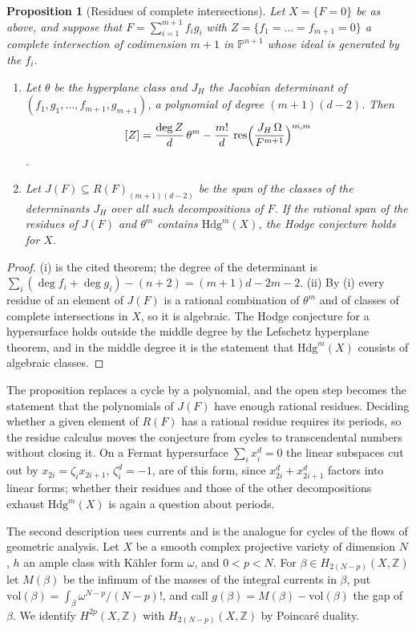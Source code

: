 \documentclass[11pt,reqno]{amsart}
\numberwithin{equation}{section}
\theoremstyle{plain}
\newtheorem{proposition}[theorem]{Proposition}
\theoremstyle{definition}
\newcommand{\ZZ}{\mathbb{Z}}
\newcommand{\PP}{\mathbb{P}}
\newcommand{\Hdg}{\mathrm{Hdg}}
\begin{document}
\begin{proposition}[Residues of complete intersections]\label{prop:residues}
Let $X=\{F=0\}$ be as above, and suppose that $F=\sum_{i=1}^{m+1}f_{i}g_{i}$ with $Z=\{f_{1}=\dots=f_{m+1}=0\}$ a complete intersection of codimension $m+1$ in $\PP^{n+1}$ whose ideal is generated by the $f_{i}$.
\begin{enumerate}[label=\textup{(\roman*)},leftmargin=2.4em,itemsep=2pt]
\item Let $\theta$ be the hyperplane class and $J_{H}$ the Jacobian determinant of $(f_{1},g_{1},\dots,f_{m+1},g_{m+1})$, a polynomial of degree $(m+1)(d-2)$. Then
\[
[Z]=\frac{\deg Z}{d}\,\theta^{m}-\frac{m!}{d}\,\operatorname{res}\Bigl(\frac{J_{H}\,\Omega}{F^{m+1}}\Bigr)^{m,m}
\]
\cite[Thm.~1.1]{VL22}.
\item Let $J(F)\subseteq R(F)_{(m+1)(d-2)}$ be the span of the classes of the determinants $J_{H}$ over all such decompositions of $F$. If the rational span of the residues of $J(F)$ and $\theta^{m}$ contains $\Hdg^{m}(X)$, the Hodge conjecture holds for $X$.
\end{enumerate}
\end{proposition}

\begin{proof}
(i) is the cited theorem; the degree of the determinant is $\sum_{i}(\deg f_{i}+\deg g_{i})-(n+2)=(m+1)d-2m-2$. (ii) By (i) every residue of an element of $J(F)$ is a rational combination of $\theta^{m}$ and of classes of complete intersections in $X$, so it is algebraic. The Hodge conjecture for a hypersurface holds outside the middle degree by the Lefschetz hyperplane theorem, and in the middle degree it is the statement that $\Hdg^{m}(X)$ consists of algebraic classes.
\end{proof}

The proposition replaces a cycle by a polynomial, and the open step becomes the statement that the polynomials of $J(F)$ have enough rational residues. Deciding whether a given element of $R(F)$ has a rational residue requires its periods, so the residue calculus moves the conjecture from cycles to transcendental numbers without closing it. On a Fermat hypersurface $\sum_{i}x_{i}^{d}=0$ the linear subspaces cut out by $x_{2i}=\zeta_{i}x_{2i+1}$, $\zeta_{i}^{d}=-1$, are of this form, since $x_{2i}^{d}+x_{2i+1}^{d}$ factors into linear forms; whether their residues and those of the other decompositions exhaust $\Hdg^{m}(X)$ is again a question about periods.

The second description uses currents and is the analogue for cycles of the flows of geometric analysis. Let $X$ be a smooth complex projective variety of dimension $N$, $h$ an ample class with K\"ahler form $\omega$, and $0<p<N$. For $\beta\in H_{2(N-p)}(X,\ZZ)$ let $M(\beta)$ be the infimum of the masses of the integral currents in $\beta$, put $\mathrm{vol}(\beta)=\int_{\beta}\omega^{N-p}/(N-p)!$, and call $g(\beta)=M(\beta)-\mathrm{vol}(\beta)$ the gap of $\beta$. We identify $H^{2p}(X,\ZZ)$ with $H_{2(N-p)}(X,\ZZ)$ by Poincar\'e duality.
\end{document}
